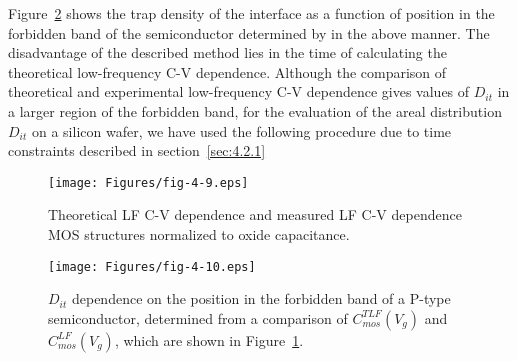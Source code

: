 Figure~\ref{fig:4.10} shows the trap density of the interface as a
function of position in the forbidden band of the semiconductor
determined by in the above manner.  The disadvantage of the described
method lies in the time of calculating the theoretical low-frequency
C-V dependence. Although the comparison of theoretical and
experimental low-frequency C-V dependence gives values of $D_{it}$ in
a larger region of the forbidden band, for the evaluation of the areal
distribution $D_{it}$ on a silicon wafer, we have used the following
procedure due to time constraints described in section~\ref{sec:4.2.1}

\begin{figure}[h!]\centering
  \begin{minipage}[c]{\myfiguresize}
    \begin{center}
      \texttt{[image: Figures/fig-4-9.eps]}
      \caption[Theoretical LF C-V dependence and measured LF C-V
        dependence]{Theoretical LF C-V dependence and measured LF C-V
        dependence MOS structures normalized to oxide
        capacitance.}\label{fig:4.9}
    \end{center}
  \end{minipage}
\end{figure}

\begin{figure}[h!]\centering
  \begin{minipage}[c]{\myfiguresize}
    \begin{center}
      \texttt{[image: Figures/fig-4-10.eps]}
      \caption[Dependence of $D_{it}$ on the position in the forbidden
        band of the semiconductor determined from the comparison of
        $C_{mos}^{TLF}(V_{g})$ and $C_{mos}^{LF}(V_{g})$]{$D_{it}$
        dependence on the position in the forbidden band of a P-type
        semiconductor, determined from a comparison of
        $C_{mos}^{TLF}(V_{g})$ and $C_{mos}^{LF}(V_{g})$, which are
        shown in Figure~\ref{fig:4.9}.}\label{fig:4.10}
    \end{center}
  \end{minipage}
\end{figure}


